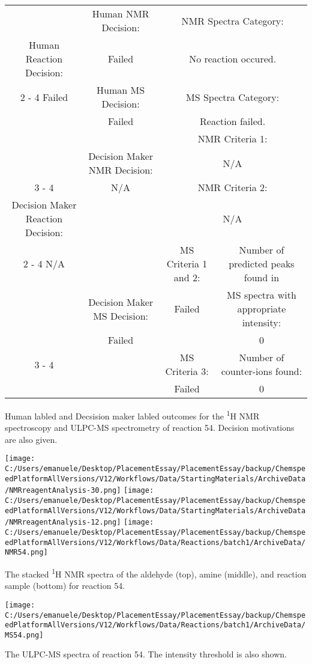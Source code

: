 \documentclass{article}%
\begin{document}
\begin{Decision Table}[H]%
\begin{tabular}{|c|c|c|c|}%
\hline%
&Human NMR Decision:&\multicolumn{2}{|c|}{NMR Spectra Category:}\\%
Human Reaction Decision:&Failed&\multicolumn{2}{|c|}{No reaction occured.}\\%
\cline{2%
-%
4}%
Failed&Human MS Decision:&\multicolumn{2}{|c|}{MS Spectra Category:}\\%
&Failed&\multicolumn{2}{|c|}{Reaction failed.}\\%
\hline%
&&\multicolumn{2}{|c|}{NMR Criteria 1:}\\%
&Decision Maker NMR Decision:&\multicolumn{2}{|c|}{N/A}\\%
\cline{3%
-%
4}%
&N/A&\multicolumn{2}{|c|}{NMR Criteria 2:}\\%
Decision Maker Reaction Decision:&&\multicolumn{2}{|c|}{N/A}\\%
\cline{2%
-%
4}%
N/A&&MS Criteria 1 and 2:&Number of predicted peaks found in\\%
&Decision Maker MS Decision:&Failed&MS spectra with appropriate intensity:\\%
&Failed&&0\\%
\cline{3%
-%
4}%
&&MS Criteria 3:&Number of counter{-}ions found:\\%
&&Failed&0\\%
\hline%
\end{tabular}%
\caption{Human labled and Decsision maker labled outcomes for the \textsuperscript{1}H NMR spectroscopy and ULPC-MS spectrometry of reaction 54. Decision motivations are also given.}%
\end{Decision Table}%
\begin{NMR Spectra}[H]%
\begin{center}%
\texttt{[image: C:/Users/emanuele/Desktop/PlacementEssay/PlacementEssay/backup/ChemspeedPlatformAllVersions/V12/Workflows/Data/StartingMaterials/ArchiveData/NMRreagentAnalysis-30.png]}\hfill%
\texttt{[image: C:/Users/emanuele/Desktop/PlacementEssay/PlacementEssay/backup/ChemspeedPlatformAllVersions/V12/Workflows/Data/StartingMaterials/ArchiveData/NMRreagentAnalysis-12.png]}\hfill%
\texttt{[image: C:/Users/emanuele/Desktop/PlacementEssay/PlacementEssay/backup/ChemspeedPlatformAllVersions/V12/Workflows/Data/Reactions/batch1/ArchiveData/NMR54.png]}\hfill%
\end{center}%
\caption{The stacked \textsuperscript{1}H NMR spectra of the aldehyde (top), amine (middle), and reaction sample (bottom) for reaction 54.}%
\end{NMR Spectra}%
\begin{MS Spectra}[H]%
\begin{center}%
\texttt{[image: C:/Users/emanuele/Desktop/PlacementEssay/PlacementEssay/backup/ChemspeedPlatformAllVersions/V12/Workflows/Data/Reactions/batch1/ArchiveData/MS54.png]}\hfill%
\end{center}%
\caption{The ULPC-MS spectra of reaction 54. The intensity threshold is also shown.}%
\end{MS Spectra}%
\end{document}
